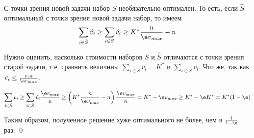 С точки зрения новой задачи набор $S$ необязательно оптимален. То есть, если $\hat{S}$ -- оптимальный с точки зрения новой задачи набор, то имеем $$\sum_{i\in\hat S}\hat{v_i} \geq \sum_{i\in S} \hat{v_i} \geq K^*\frac{n}{\e v_{max}} - n$$

Нужно оценить, насколько стоимости наборов $S$ и $\hat S$ отличаются с точки зрения старой задачи, т.е. сравнить величины $\sum\limits_{i\in S}v_i = K^*$ и $\sum\limits_{i\in\hat S}v_i$. Что же, так как $\hat{v_i} \leq \frac{v_i n}{\e v_{max}}$,

$$\sum_{i\in\hat S}v_i \geq \sum_{i\in\hat S} \hat{v_i} \frac{\e v_{max}}{n} \geq \left(K^*\frac{n}{\e v_{max}} - n\right)\frac{\e v_{max}}{n} = K^* - \e v_{max} \geq K^* - \e K^* = K^*(1-\e)$$

Таким образом, полученное решение  хуже оптимального не более, чем в $\frac{1}{1-\e}$ раз. \qed
